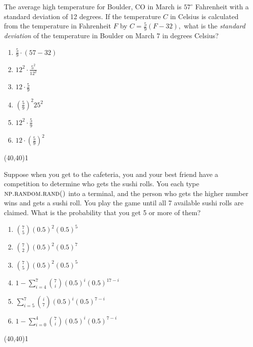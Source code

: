 \documentclass[addpoints]{exam}
\def\solutions{0}
\begin{document}
{\begin{questions}
\question[3] The average high temperature for Boulder, CO in March is $57^\circ$ Fahrenheit with a standard deviation of 12 degrees.  If the temperature $C$ in Celsius is calculated from the temperature in Fahrenheit $F$ by  $C=\frac{5}{9}(F-32),$ what is the \textit{standard deviation} of the temperature in Boulder on March 7 in degrees Celsius?

\begin{minipage}[b]{.85\textwidth}
	\begin{enumerate}[label=\Alph*.]
		\item $\frac{5}{9}\cdot (57-32)$
		\item $12^2 \cdot \frac{5^2}{12^2}$
		\item $12\cdot \frac{5}{9}$
		\item $\left( \frac{5}{9}\right)^2 25^2$
		\item $12^2 \cdot \frac{5}{9}$
		\item $12\cdot \left( \frac{5}{9}\right) ^2$
	\end{enumerate}
\end{minipage}
\begin{minipage}[b]{.1\textwidth}
	\vspace{\fill}\framebox(40,40){\if\solutions1 \fi}
\end{minipage}
\clearpage
\question[3] Suppose when you get to the cafeteria, you and your best friend have a competition to determine who gets the sushi rolls. You each type $\textsc{np.random.rand()}$ into a terminal, and the person who gets the higher number wins and gets a sushi roll.  You play the game until all 7 available sushi rolls are claimed.  What is the probability that you get 5 or more of them?

\vspace{2mm}
\begin{minipage}[b]{.85\textwidth}
	\begin{enumerate}[label=\Alph*.] 
		\item $ \displaystyle {7 \choose 5} (0.5)^2 (0.5)^5 $ 
		\item $ \displaystyle {7 \choose 2} (0.5)^2 (0.5)^7 $ 
		\item $ \displaystyle {7 \choose 5} (0.5)^2 (0.5)^5 $ 
		\item $ \displaystyle 1 - \sum_{i=4}^{7} {7 \choose i}(0.5)^i(0.5)^{17-i} $
		\item $ \displaystyle \sum_{i=5}^{7} {i \choose 7}(0.5)^i(0.5)^{7-i} $
		\item $ \displaystyle 1- \sum_{i=0}^{4} {7 \choose i}(0.5)^i(0.5)^{7-i}$
	\end{enumerate}
\end{minipage}
\begin{minipage}[b]{.1\textwidth}
	\vspace{\fill}\framebox(40,40){\if\solutions1 \fi}
\end{minipage}



\end{questions}}
\end{document}
